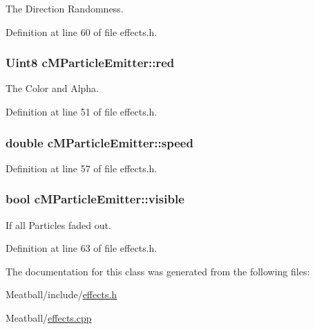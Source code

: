 The Direction Randomness. 



Definition at line 60 of file effects.\-h.

\hypertarget{classc_m_particle_emitter_a8ef694bdcf4547deaba04299d20b7957}{
\subsubsection[{red}]{\setlength{\rightskip}{0pt plus 5cm}Uint8 c\-M\-Particle\-Emitter\-::red}}\label{classc_m_particle_emitter_a8ef694bdcf4547deaba04299d20b7957}


The Color and Alpha. 



Definition at line 51 of file effects.\-h.

\hypertarget{classc_m_particle_emitter_acfe8c4c88b2699b3717772c2809e4960}{
\subsubsection[{speed}]{\setlength{\rightskip}{0pt plus 5cm}double c\-M\-Particle\-Emitter\-::speed}}\label{classc_m_particle_emitter_acfe8c4c88b2699b3717772c2809e4960}


Definition at line 57 of file effects.\-h.

\hypertarget{classc_m_particle_emitter_a0fd2c32626022c434dc27000fb507526}{
\subsubsection[{visible}]{\setlength{\rightskip}{0pt plus 5cm}bool c\-M\-Particle\-Emitter\-::visible}}\label{classc_m_particle_emitter_a0fd2c32626022c434dc27000fb507526}


If all Particles faded out. 



Definition at line 63 of file effects.\-h.



The documentation for this class was generated from the following files\-:\begin{DoxyCompactItemize}
\item 
Meatball/include/\hyperlink{effects_8h}{effects.\-h}\item 
Meatball/\hyperlink{effects_8cpp}{effects.\-cpp}\end{DoxyCompactItemize}
